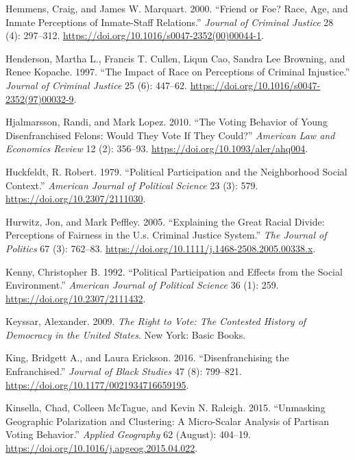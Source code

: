 \documentclass[
  12pt,
]{article}
\newlength{\cslhangindent}
\newenvironment{cslreferences}%
  {\setlength{\parindent}{0pt}%
  \everypar{\setlength{\hangindent}{\cslhangindent}}\ignorespaces}%
  {\par}
\begin{document}
\begin{cslreferences}
\leavevmode\hypertarget{ref-Hemmens2000}{}%
Hemmens, Craig, and James W. Marquart. 2000. ``Friend or Foe? Race, Age, and Inmate Perceptions of Inmate-Staff Relations.'' \emph{Journal of Criminal Justice} 28 (4): 297--312. \url{https://doi.org/10.1016/s0047-2352(00)00044-1}.

\leavevmode\hypertarget{ref-Henderson1997}{}%
Henderson, Martha L., Francis T. Cullen, Liqun Cao, Sandra Lee Browning, and Renee Kopache. 1997. ``The Impact of Race on Perceptions of Criminal Injustice.'' \emph{Journal of Criminal Justice} 25 (6): 447--62. \url{https://doi.org/10.1016/s0047-2352(97)00032-9}.

\leavevmode\hypertarget{ref-Hjalmarsson2010}{}%
Hjalmarsson, Randi, and Mark Lopez. 2010. ``The Voting Behavior of Young Disenfranchised Felons: Would They Vote If They Could?'' \emph{American Law and Economics Review} 12 (2): 356--93. \url{https://doi.org/10.1093/aler/ahq004}.

\leavevmode\hypertarget{ref-Huckfeldt1979}{}%
Huckfeldt, R. Robert. 1979. ``Political Participation and the Neighborhood Social Context.'' \emph{American Journal of Political Science} 23 (3): 579. \url{https://doi.org/10.2307/2111030}.

\leavevmode\hypertarget{ref-Hurwitz2005}{}%
Hurwitz, Jon, and Mark Peffley. 2005. ``Explaining the Great Racial Divide: Perceptions of Fairness in the U.s. Criminal Justice System.'' \emph{The Journal of Politics} 67 (3): 762--83. \url{https://doi.org/10.1111/j.1468-2508.2005.00338.x}.

\leavevmode\hypertarget{ref-Kenny1992}{}%
Kenny, Christopher B. 1992. ``Political Participation and Effects from the Social Environment.'' \emph{American Journal of Political Science} 36 (1): 259. \url{https://doi.org/10.2307/2111432}.

\leavevmode\hypertarget{ref-Keyssar2009}{}%
Keyssar, Alexander. 2009. \emph{The Right to Vote: The Contested History of Democracy in the United States}. New York: Basic Books.

\leavevmode\hypertarget{ref-King2016}{}%
King, Bridgett A., and Laura Erickson. 2016. ``Disenfranchising the Enfranchised.'' \emph{Journal of Black Studies} 47 (8): 799--821. \url{https://doi.org/10.1177/0021934716659195}.

\leavevmode\hypertarget{ref-Kinsella2015}{}%
Kinsella, Chad, Colleen McTague, and Kevin N. Raleigh. 2015. ``Unmasking Geographic Polarization and Clustering: A Micro-Scalar Analysis of Partisan Voting Behavior.'' \emph{Applied Geography} 62 (August): 404--19. \url{https://doi.org/10.1016/j.apgeog.2015.04.022}.


\end{cslreferences}
\end{document}
